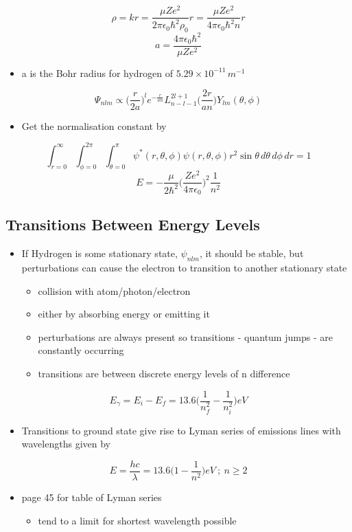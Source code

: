 \documentclass[a4paper,11pt,normalem]{article}
\begin{document}
\[
    \rho = kr = \frac{\mu Ze^2}{2\pi\epsilon_{0}\hbar^2\rho_{0}}r = \frac{\mu Ze^2}{4\pi\epsilon_{0}\hbar^2 n}r \]
\[
    a = \frac{4\pi\epsilon_{0}\hbar^2}{\mu Ze^2}
\]
\begin{itemize}
\item
  a is the Bohr radius for hydrogen of \(5.29 \times 10^{-11} \,m^{-1}\)
\end{itemize}
\[
    \Psi_{nlm} \propto \Big(\frac{r}{2a} \Big)^{l}e^{-\frac{r}{an}}L_{n - l - 1}^{2l + 1} \Big(\frac{2r}{an} \Big) Y_{lm}(\theta, \phi)
\]
\begin{itemize}
\item
  Get the normalisation constant by
\end{itemize}
\[
    \int_{r = 0}^{\infty} \int_{\phi = 0}^{2\pi} \int_{\theta = 0}^{\pi} \psi^* (r,\theta,\phi)\psi(r,\theta,\phi)r^2 \sin\theta \,d\theta\, d\phi\, dr = 1 \]
\[
    E = -\frac{\mu}{2\hbar^2}\Big(\frac{Ze^2}{4\pi\epsilon_0}\Big)^2 \frac{1}{n^2}
\]
\subsection{Transitions Between Energy Levels}\label{transitions-between-energy-levels}

\begin{itemize}
\item
  If Hydrogen is some stationary state, \(\psi_{nlm}\), it should be
  stable, but perturbations can cause the electron to transition to
  another stationary state
  \begin{itemize}
  \item
    collision with atom/photon/electron
  \item
    either by absorbing energy or emitting it
  \item
    perturbations are always present so transitions - quantum jumps -
    are constantly occurring
  \item
    transitions are between discrete energy levels of n difference
  \end{itemize}
\end{itemize}
\[
    E_{\gamma} = E_{i} - E_f = 13.6 \Big(\frac{1}{n_{f}^2} - \frac{1}{n_{i}^2} \Big)eV
\]
\begin{itemize}
\item
  Transitions to ground state give rise to Lyman series of emissions
  lines with wavelengths given by
\end{itemize}
\[
    E = \frac{hc}{\lambda} = 13.6\Big(1 - \frac{1}{n^2} \Big) eV ~;~ n \geq 2
\]
\begin{itemize}
\item
  page 45 for table of Lyman series
  \begin{itemize}
  \item
    tend to a limit for shortest wavelength possible
  \end{itemize}
\end{itemize}
\end{document}
